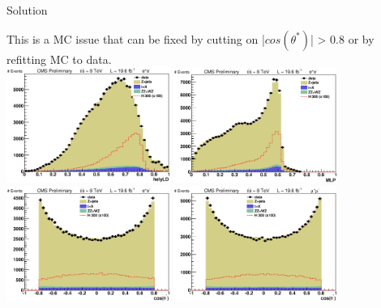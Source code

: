 \begin{frame}{Solution}
\begin{center}
This is a MC issue that can be fixed by cutting on |$cos(\theta^*)$| > 0.8 or by refitting MC to data.\\
\includegraphics[width=0.4\textwidth]{images/costhetast_cut/el/helyLD.eps}
\includegraphics[width=0.4\textwidth]{images/costhetast_cut/el/MLP.eps}\\
\includegraphics[width=0.4\textwidth]{images/costhetast_cut/el/costhetast.eps}
\includegraphics[width=0.4\textwidth]{images/costhetast_cut/mu/costhetast.eps}
\end{center}
\end{frame}




